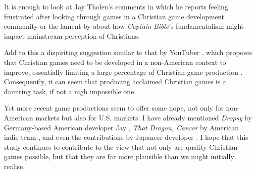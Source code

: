 It is enough to look at Jay Tholen’s comments in which he reports feeling frustrated after looking through games in a Christian game development community \parencite[paras. 6--7]{oliver_why_2014} or the lament by \textcite{screwattack_captain_2022} about how \textit{Captain Bible}’s \parencite{engelbrite_captain_1994} fundamentalism might impact mainstream perception of Christians.

Add to this a dispiriting suggestion similar to that by YouTuber \textcite{moon_channel_why_2023}, which proposes that Christian games need to be developed in a non-American context to improve, essentially limiting a large percentage of Christian game production \parencite[301]{schut_swords_2026}. 
Consequently, it can seem that producing acclaimed Christian games is a daunting task, if not a nigh impossible one.

Yet more recent game productions seem to offer some hope, not only for non-American markets but also for U.S. markets.
I have already mentioned \textit{Dropsy} by Germany-based American developer Jay \textcite{tholen_dropsy_2015}, \textit{That Dragon, Cancer} by American indie team \parencite{numinous_games_that_2016}, and even the contributions by Japanese developer \textcite{yona_in_2023, yona_and_2025}.
I hope that this study continues to contribute to the view that not only are quality Christian games possible, but that they are far more plausible than we might initially realise.
